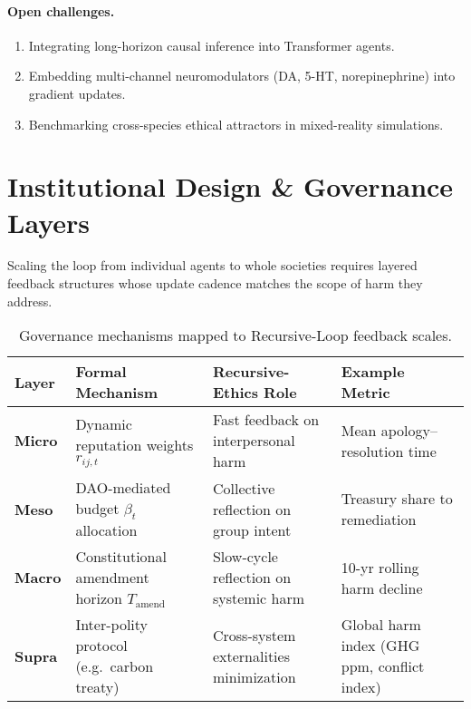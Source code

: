 \paragraph{Open challenges.}
\begin{enumerate}
\item Integrating long-horizon causal inference into Transformer agents.
\item Embedding multi-channel neuromodulators
      (DA, 5-HT, norepinephrine) into gradient updates.
\item Benchmarking cross-species ethical attractors in mixed-reality simulations.
\end{enumerate}

\section*{Institutional Design \& Governance Layers}
\label{sec:gov-layers}

Scaling the loop from individual agents to whole societies
requires layered feedback structures whose update cadence matches the
scope of harm they address.

\begin{table}[htbp!]
\centering
\renewcommand{\arraystretch}{1.15}
\begin{tabular}{@{}llll@{}}
\toprule
\textbf{Layer} & \textbf{Formal Mechanism} &
\textbf{Recursive-Ethics Role} &
\textbf{Example Metric} \\
\midrule
\textbf{Micro} &
Dynamic reputation weights $r_{ij,t}$ &
Fast feedback on interpersonal harm &
Mean apology–resolution time \\[2pt]

\textbf{Meso} &
DAO-mediated budget $\beta_t$ allocation
\cite{Basu2022} &
Collective reflection on group intent &
Treasury share to remediation \\[2pt]

\textbf{Macro} &
Constitutional amendment horizon $T_{\text{amend}}$
\cite{Ostrom1990} &
Slow-cycle reflection on systemic harm &
10-yr rolling harm decline \\[2pt]

\textbf{Supra} &
Inter-polity protocol (e.g.\ carbon treaty) \cite{Nisan2007} &
Cross-system externalities minimization &
Global harm index (GHG ppm, conflict index) \\
\bottomrule
\end{tabular}
\caption{Governance mechanisms mapped to Recursive-Loop feedback scales.}
\label{tab:gov-layers}
\end{table}

